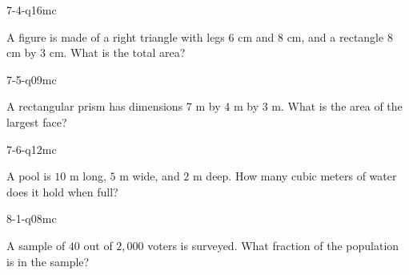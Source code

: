 \begin{practiceQuestion}{7-4-q16}{mc}
\begin{questionText}
A figure is made of a right triangle with legs $6$ cm and $8$ cm, and a rectangle $8$ cm by $3$ cm. What is the total area?
\end{questionText}
\end{practiceQuestion}

\begin{practiceQuestion}{7-5-q09}{mc}
\begin{questionText}
A rectangular prism has dimensions $7$ m by $4$ m by $3$ m. What is the area of the largest face?
\end{questionText}
\end{practiceQuestion}

\begin{practiceQuestion}{7-6-q12}{mc}
\begin{questionText}
A pool is $10$ m long, $5$ m wide, and $2$ m deep. How many cubic meters of water does it hold when full?
\end{questionText}
\end{practiceQuestion}

\begin{practiceQuestion}{8-1-q08}{mc}
\begin{questionText}
A sample of $40$ out of $2{,}000$ voters is surveyed. What fraction of the population is in the sample?
\end{questionText}
\end{practiceQuestion}


